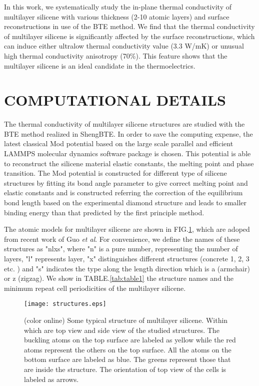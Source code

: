 \documentclass[aps,prb,twocolumn,showpacs,amsmath,amssymb]{revtex4-1}
\begin{document}
In this work, we systematically study the in-plane thermal conductivity of multilayer silicene with various thickness  (2-10 atomic layers) and surface reconstructions in use of  the BTE method.  We find that the thermal conductivity of multilayer silicene is significantly affected by the surface reconstructions, which can induce  either ultralow thermal conductivity value ($3.3$ W/mK) or unusual high thermal conductivity anisotropy (70\%).  This feature shows that the  multilayer silicene is an ideal candidate in the thermoelectrics.  


\section{COMPUTATIONAL DETAILS}

The thermal conductivity of multilayer silicene structures are studied with the BTE method realized in ShengBTE\cite{Li2014}. In order to save the computing expense, the latest classical Mod potential\cite{Parks2007} based on the large scale parallel and efficient LAMMPS molecular dynamics software package is chosen\cite{Kumagai2007Development}. This potential is able to reconstruct the silicene material elastic constants, the melting point and phase transition. The Mod potential is constructed for different type of silicene structures by fitting its bond angle parameter to give correct melting point and elastic constants and is constructed referring the correction of the equilibrium bond length based on the experimental diamond structure and leads to smaller binding energy than that predicted by the first principle method.

The atomic models for multilayer silicene are shown in FIG.\ref{fig:structures}, which are adoped from recent work of Guo \emph{et al}\cite{Guo2015Structural}. For convenience, we define the names of these structures as "nlxs", where "n" is a pure number, representing the number of layers, "l" represents layer, "x" distinguishes different structures (concrete 1, 2, 3 etc. ) and "s" indicates the type along the length direction which is a (armchair) or z (zigzag). We show in TABLE.\ref{tab:table1} the structure names and  the minimum repeat cell periodicities of the multilayer silicene.

\begin{figure}[b]
  \texttt{[image: structures.eps]}
  \caption{\label{fig:structures}  (color online) Some typical structure of multilayer silicene. Within which  are top view and side view of the studied structures. The buckling atoms on the top surface are labeled as yellow while the red atoms represent the others on the top surface. All the atoms on the bottom surface are labeled as blue. The greens represent those that are inside the structure. The orientation of top view of the cells is labeled as arrows.}
\end{figure}
\end{document}
